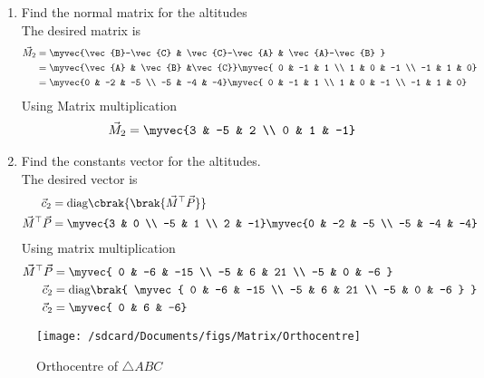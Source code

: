\documentclass[11pt]{book}
\begin{document}
\begin{enumerate}[label=\thesubsection.\arabic*.,ref=\thesubsection.\theenumi]
\item Find the normal matrix for the altitudes \\
\solution  The desired matrix is 
\begin{align}
\vec{M}_2 &= \myvec{\vec{B}-\vec{C} & \vec{C}-\vec{A} & \vec{A}-\vec{B} }
\\
&= 
\myvec{\vec{A} & \vec{B} &\vec{C}}
\myvec{ 0 & -1 & 1 \\ 1 & 0 & -1 \\ -1 & 1 & 0} \\
&= 
\myvec{0 & -2 & -5 \\ -5 & -4 & -4}
\myvec{ 0 & -1 & 1 \\ 1 & 0 & -1 \\ -1 & 1 & 0}
\end{align}
Using Matrix multiplication 
\begin{align}
   \vec{M}_2 &=\myvec{3 & -5 & 2 \\ 0 & 1 & -1}
\end{align}

\item Find the constants vector for the altitudes. \\
\solution The desired vector is 
\begin{align}
\vec{c}_2 &= \text{diag}\cbrak{\brak{\vec{M}^{\top}\vec{P}}} \\
\vec{M}^{\top}\vec{P} &= \myvec{3 & 0 \\ -5 & 1 \\ 2 & -1}\myvec{0 & -2 & -5 \\ -5 & -4 & -4} \\
\end{align}
Using matrix multiplication
\begin{align}
 \vec{M}^{\top}\vec{P}    &=\myvec{ 0 & -6 & -15 \\ -5 & 6 & 21 \\ -5 & 0 & -6 } \\
    \vec{c}_2 &= \text{diag}\brak{ \myvec{ 0 & -6 & -15 \\ -5 & 6 & 21 \\ -5 & 0 & -6 } } \\
 \vec{c}_2   &= \myvec{ 0 & 6 & -6}
\end{align}
\end{enumerate}
\begin{figure}[H]
\texttt{[image: /sdcard/Documents/figs/Matrix/Orthocentre]}
\caption{Orthocentre of $\triangle ABC$}
\label{fig:fig4}
\end{figure}
\end{document}
